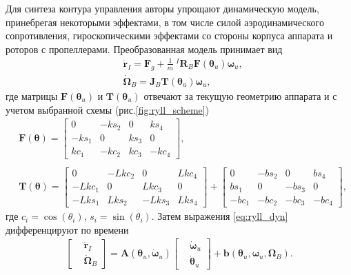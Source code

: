 Для синтеза контура управления авторы упрощают динамическую модель, принебрегая некоторыми эффектами,
в том числе силой аэродинамического сопротивления, гироскопическими эффектами со стороны корпуса аппарата и роторов с пропеллерами. Преобразованная модель принимает вид
\begin{equation} \label{eq:ryll_dyn}
\begin{aligned}
&\ddot{\bm r}_I = \bm F_g + \frac{1}{m}~^I \bm R_B \bm F(\bm \theta_u) \bm \omega_u,
\\
&\dot {\bm \Omega}_B = \bm J_B \bm T(\bm \theta_u) \bm \omega_u,
\end{aligned}
\end{equation}
где матрицы $\bm F(\bm \theta_u)$ и $\bm T(\bm \theta_u)$ отвечают за текущую геометрию аппарата и с учетом выбранной схемы (рис.\ref{fig:ryll_scheme}) 
\begin{equation} \label{eq:ryl_dyn_matrixes}
\begin{aligned}
&\bm F(\bm \theta) =
\begin{bmatrix}
0&-ks_2&0&ks_4\\
-ks_1&0&ks_3&0\\
kc_1&-kc_2&kc_3&-kc_4
\end{bmatrix},
\\
\phantom{}
\\
&\bm T(\bm \theta) =
\begin{bmatrix}
0&-Lkc_2&0&Lkc_4\\
-Lkc_1&0&Lkc_3&0\\
-Lks_1&Lks_2&-Lks_3&Lks_4
\end{bmatrix}
+
\begin{bmatrix}
0&-bs_2&0&bs_4\\
bs_1&0&-bs_3&0\\
-bc_1&-bc_2&-bc_3&-bc_4
\end{bmatrix}, 
\end{aligned}
\end{equation}
где $c_i = \cos(\theta_i)$, $s_i = \sin(\theta_i)$.
Затем выражения \eqref{eq:ryll_dyn} дифференцируют по времени
\begin{equation} \label{eq:ryll_dyn_dot}
\begin{aligned}
\begin{bmatrix}
&\dddot{\bm r}_I
\\
&\ddot{\bm \Omega}_B
\end{bmatrix}
=
\bm A(\bm \theta_u, \dot {\bm \omega}_u)
\begin{bmatrix}
&\dot{\bm \omega}_u
\\
&\dot{\bm \theta}_u
\end{bmatrix}
+
\bm b(\bm \theta_u, \bm \omega_u, \bm \Omega_B).
\end{aligned}
\end{equation}
